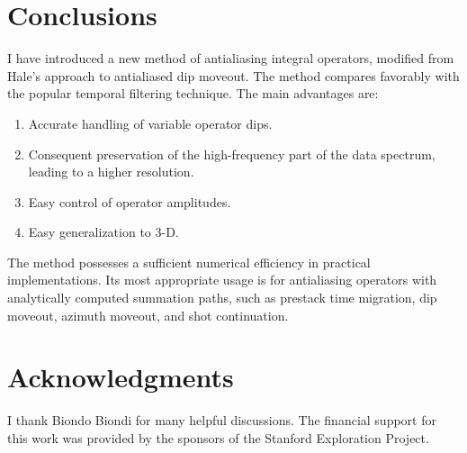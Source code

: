 


\section{Conclusions}
I have introduced a new method of antialiasing integral operators,
modified from Hale's approach to antialiased dip moveout. The method
compares favorably with the popular temporal filtering technique. The
main advantages are:
\begin{enumerate}
\item Accurate handling of variable operator dips.
\item Consequent preservation of the high-frequency part of the data
spectrum, leading to a higher resolution.
\item Easy control of operator amplitudes.
\item Easy generalization to 3-D.
\end{enumerate}
The method possesses a sufficient numerical efficiency in practical
implementations. Its most appropriate usage is for antialiasing
operators with analytically computed summation paths, such as prestack
time migration, dip moveout, azimuth moveout, and shot continuation.

\section{Acknowledgments}

I thank Biondo Biondi for many helpful discussions. The financial
support for this work was provided by the sponsors of the Stanford
Exploration Project.

\newpage



